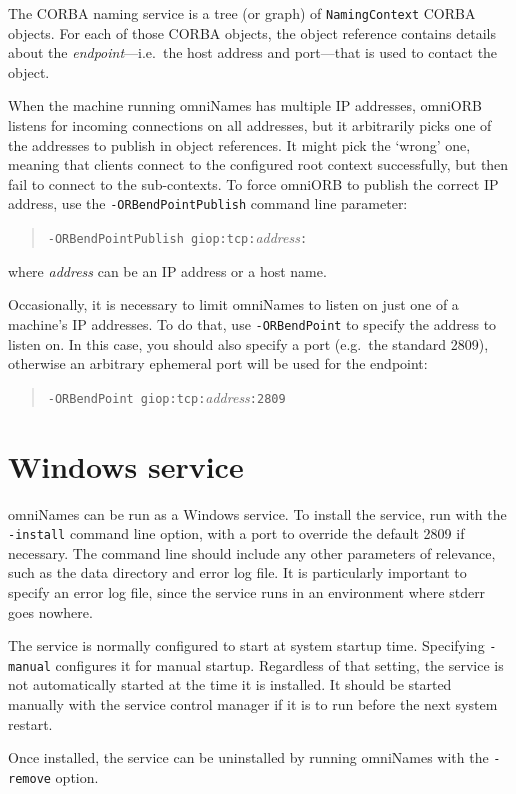 \documentclass[draft,a4paper,11pt,twoside]{article}
\newcommand{\cmdline}[1]{\texttt{#1}}
\newcommand{\code}[1]{\texttt{#1}}
\begin{document}
The CORBA naming service is a tree (or graph) of \code{NamingContext}
CORBA objects. For each of those CORBA objects, the object reference
contains details about the \emph{endpoint}---i.e.\ the host address
and port---that is used to contact the object.

When the machine running omniNames has multiple IP addresses, omniORB
listens for incoming connections on all addresses, but it arbitrarily
picks one of the addresses to publish in object references. It might
pick the `wrong' one, meaning that clients connect to the configured
root context successfully, but then fail to connect to the
sub-contexts. To force omniORB to publish the correct IP address, use
the \cmdline{-ORBendPointPublish} command line parameter:

\begin{quote}
\cmdline{-ORBendPointPublish giop:tcp:}\textit{address}\cmdline{:}
\end{quote}

\noindent where \textit{address} can be an IP address or a host name.

Occasionally, it is necessary to limit omniNames to listen on just one
of a machine's IP addresses. To do that, use \cmdline{-ORBendPoint} to
specify the address to listen on. In this case, you should also
specify a port (e.g.\ the standard 2809), otherwise an arbitrary
ephemeral port will be used for the endpoint:

\begin{quote}
\cmdline{-ORBendPoint giop:tcp:}\textit{address}\cmdline{:2809}
\end{quote}


\section{Windows service}

omniNames can be run as a Windows service. To install the service, run
with the \cmdline{-install} command line option, with a port to
override the default 2809 if necessary. The command line should
include any other parameters of relevance, such as the data directory
and error log file. It is particularly important to specify an error
log file, since the service runs in an environment where stderr goes
nowhere.

The service is normally configured to start at system startup time.
Specifying \cmdline{-manual} configures it for manual startup.
Regardless of that setting, the service is not automatically started
at the time it is installed. It should be started manually with the
service control manager if it is to run before the next system
restart.

Once installed, the service can be uninstalled by running omniNames
with the \cmdline{-remove} option.
\end{document}
